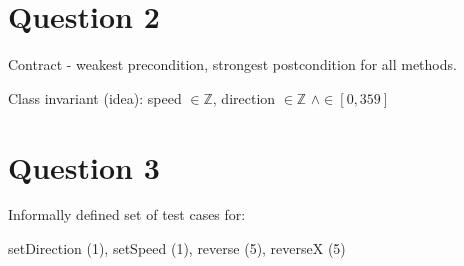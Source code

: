 \documentclass{article}
\begin{document}
\section*{Question 2}

Contract - weakest precondition, strongest postcondition for all methods.

Class invariant (idea): speed $\in \mathbb{Z}$, direction $\in \mathbb{Z}$ $\land \in [0,359]$

\section*{Question 3}

Informally defined set of test cases for:

setDirection (1), setSpeed (1), reverse (5), reverseX (5)
\end{document}
